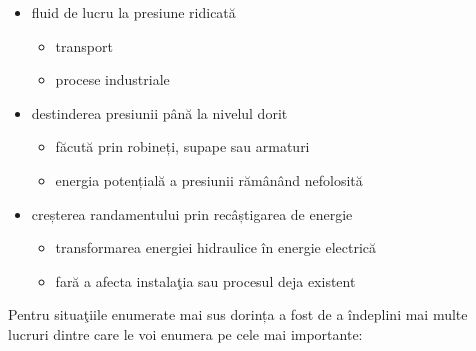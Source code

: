 \begin{itemize}
	\item fluid de lucru la presiune ridicat\u{a}
		\begin{itemize}
			\item transport
			\item procese industriale
		\end{itemize}
	\item destinderea presiunii p\^{a}n\u{a} la nivelul dorit
		\begin{itemize}
			\item făcută prin robineți, supape sau armaturi
			\item energia potențială a presiunii rămânând nefolosit\u{a}
		\end{itemize}
	\item creșterea randamentului prin recâștigarea de energie
		\begin{itemize}
			\item transformarea energiei hidraulice \^{i}n energie electric\u{a}
			\item far\u{a} a afecta instala\c{t}ia sau procesul deja existent
		\end{itemize}	
\end{itemize}

Pentru situa\c{t}iile enumerate mai sus dorința a fost de a îndeplini mai multe lucruri dintre care le voi enumera pe cele mai importante:

